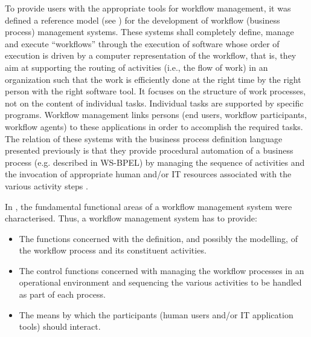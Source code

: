 To provide users with the appropriate tools for workflow management, 
it was defined a reference model (see \cite{hollingsworth95}) for the development of workflow (business process) management systems. 
These systems shall completely define, manage and execute ``workflows'' through the execution of software
whose order of execution is driven by a computer representation of the workflow, that is, 
they aim at supporting the routing of activities (i.e., the flow of work) in an organization such
that the work is efficiently done at the right time by the right person with the right
software tool. It focuses on the structure of work processes, not on the content of 
individual tasks. Individual tasks are supported by specific programs.
Workflow management links persons (end users, workflow participants, workflow
agents) to these applications in order to accomplish the required tasks. The relation of these systems with the business process
definition language presented previously is that they provide procedural automation of a business process (e.g. described in WS-BPEL) by
managing the sequence of activities and the invocation of appropriate human and/or IT resources
associated with the various activity steps \cite{hollingsworth95}. 

In \cite{hollingsworth95}, the fundamental functional areas of a workflow management system were characterised. Thus, a workflow 
management system has to provide:

\begin{itemize}
\item The functions concerned with the definition, and possibly the modelling, of the workflow process and its
constituent activities.

\item The control functions concerned with managing the workflow processes in an operational
environment and sequencing the various activities to be handled as part of each process.

\item The means by which the participants (human users and/or IT application tools) should interact.

\end{itemize}



